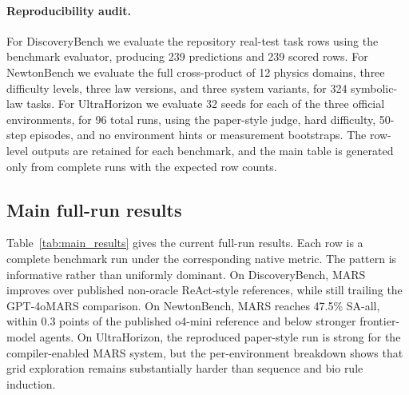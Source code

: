 \documentclass[letterpaper]{article}
\newcommand{\mars}{\textsc{MARS}\xspace}
\newcommand{\gptfour}{GPT-4o\xspace}
\begin{document}
\paragraph{Reproducibility audit.}
For DiscoveryBench we evaluate the repository real-test task rows using the
benchmark evaluator, producing 239 predictions and 239 scored rows. For
NewtonBench we evaluate the full cross-product of 12 physics domains, three
difficulty levels, three law versions, and three system variants, for 324
symbolic-law tasks. For UltraHorizon we evaluate 32 seeds for each of the
three official environments, for 96 total runs, using the paper-style judge,
hard difficulty, 50-step episodes, and no environment hints or measurement
bootstraps. The row-level outputs are retained for each benchmark, and the main
table is generated only from complete runs with the expected row counts.

\begin{table}[H]
\centering
\caption{Benchmark interfaces and metrics.}
\label{tab:benchmarks}
\small
{}
\end{table}

\subsection{Main full-run results}

Table~\ref{tab:main_results} gives the current full-run results. Each row is a
complete benchmark run under the corresponding native metric. The pattern is
informative rather than uniformly dominant. On DiscoveryBench, \mars improves
over published non-oracle ReAct-style references, while still trailing the
\gptfour \mars comparison. On NewtonBench, \mars reaches 47.5\% SA-all, within
0.3 points of the published o4-mini reference and below stronger
frontier-model agents. On UltraHorizon, the reproduced paper-style run is
strong for the compiler-enabled \mars system, but the per-environment
breakdown shows that grid exploration remains substantially harder than
sequence and bio rule induction.
\end{document}
